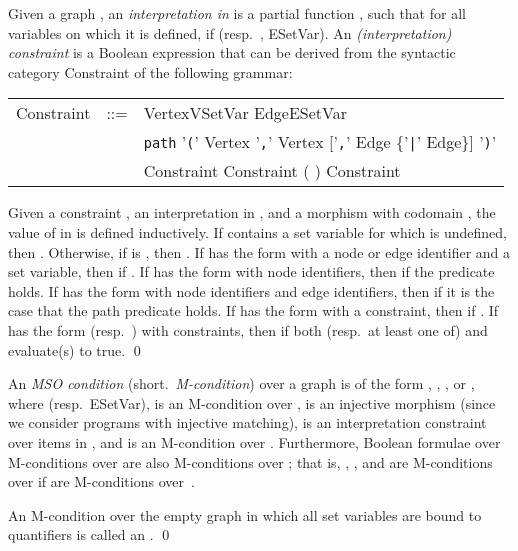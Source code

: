 \documentclass{llncs}
\begin{document}
	

	
	\begin{definition}\label{def:interpretation}\rm
		Given a graph , an \emph{interpretation  in } is a partial function , such that for all variables  on which it is defined,  if  (resp.\ , ESetVar). An \emph{(interpretation) constraint} is a Boolean expression that can be derived from the syntactic category Constraint of the following grammar:
	

	\begin{center}
			\begin{tabular}{lcl}
		Constraint & ::= & VertexVSetVar   EdgeESetVar\\
					& &  \verb#path# '\verb#(#' Vertex '\verb#,#' Vertex ['\verb#,#'  Edge \{'\verb#|#' Edge\}] '\verb#)#'\\
					& &   Constraint  Constraint (  ) Constraint   \\
			\end{tabular}
	\end{center}

	
	Given a constraint , an interpretation  in , and a morphism  with codomain , the value of  in  is defined inductively. If  contains a set variable for which  is undefined, then . Otherwise, if  is , then . If  has the form  with  a node or edge identifier and  a set variable, then  if . If  has the form  with  node identifiers, then  if the predicate  holds. If  has the form  with  node identifiers and  edge identifiers, then  if it is the case that the path predicate  holds. If  has the form  with  a constraint, then  if . If  has the form  (resp.\ ) with  constraints, then  if both (resp.\ at least one of)  and  evaluate(s) to true.
		\qed
	\end{definition}


	
	
	
	\begin{definition}\rm\label{defn:M-condition}
		An \emph{MSO condition} (short.\ \emph{M-condition}) over a graph  is of the form , , , or , where  (resp.\ ESetVar),  is an M-condition over ,  is an injective morphism (since we consider programs with injective matching),  is an interpretation constraint over items in , and  is an M-condition over . Furthermore, Boolean formulae over M-conditions over  are also M-conditions over ; that is, , , and  are M-conditions over  if  are M-conditions over~.
		
		An M-condition over the empty graph  in which all set variables are bound to quantifiers is called an .
		\qed
	\end{definition}
\end{document}
